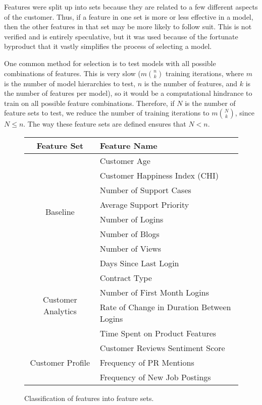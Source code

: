 \documentclass{article}
\begin{document}
	Features were split up into sets because they are related to a few different aspects of the customer. Thus, if a feature in one set is more or less effective in a model, then the other features in that set may be more likely to follow suit. This is not verified and is entirely speculative, but it was used because of the fortunate byproduct that it vastly simplifies the process of selecting a model. 
	
	One common method for selection is to test models with all possible combinations of features. This is very slow ($m {n \choose k}$ training iterations, where $m$ is the number of model hierarchies to test, $n$ is the number of features, and $k$ is the number of features per model), so it would be a computational hindrance to train on all possible feature combinations. Therefore, if $N$ is the number of feature sets to test, we reduce the number of training iterations to $m {N \choose k}$, since $N\leq n$. The way these feature sets are defined ensures that $N<n$.
	
	\begin{figure}[H]
		\centering
		\begin{tabular}{|c|l|}
			\hline
			Feature Set & Feature Name \\
			\hline
			\hline
			\multirow{8}{*}{Baseline} & Customer Age \\
			& Customer Happiness Index (CHI) \\
			& Number of Support Cases \\
			& Average Support Priority \\
			& Number of Logins \\
			& Number of Blogs \\
			& Number of Views \\
			& Days Since Last Login \\
			\hline
			\multirow{4}{*}{Customer Analytics} & Contract Type \\
			& Number of First Month Logins \\
			& Rate of Change in Duration Between Logins \\
			& Time Spent on Product Features \\
			\hline
			\multirow{3}{*}{Customer Profile} & Customer Reviews Sentiment Score \\
			& Frequency of PR Mentions \\
			& Frequency of New Job Postings \\
			\hline
		\end{tabular}
		\caption{Classification of features into feature sets.}
		\label{FeatureSetNameMap}
	\end{figure}
\end{document}

